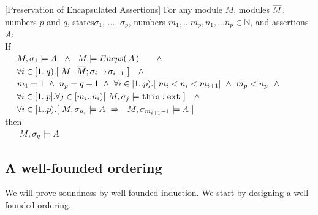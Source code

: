 \begin{auxLemma}
\label{lemma:external_exec_preserves}[Preservation of Encapsulated Assertions]
For any module $M$, modules $\overline{M}$, numbers $p$ and $q$, states$\sigma_1$, .... $\sigma_p$,  numbers $m_1,...m_p, n_1, ... n_p \in \mathbb{N}$, and assertions $A$:
\\
If \\
$\strut \ \ \ \  M, \sigma_1 \models  A   \  \ \wedge \ \ M \models \encaps A \ \ \ \  \ \ \wedge$\\
$\strut \ \ \ \  \forall i\in [1..q).[\   M\cdot \overline{M};\sigma_i\! \rightarrow\! {\sigma_{i+1}}\  ] \  \ \ \wedge$\\
$\strut \ \ \ \  m_1=1 \ \wedge\ n_p=q+1 \  \wedge\ \forall i\in[1..p).[  \  m_i < n_i < m_{i+1}  ] \ \wedge \ m_p<n_p\ \ \wedge  $\\
$\strut \ \ \ \  \forall i\in[1..p].\forall j\in [m_i..n_i)[\   M,\sigma_j \models \texttt{this}:\mbox{\normalfont{\texttt{ext}}} \ ] \  \ \ \wedge$\\
$\strut \ \ \ \ \forall i\in[1..p). [ \ M,\sigma_{n_i} \models A   \ \Rightarrow \ \ 
M, {\sigma_{m_{i+1}-1}} \models A  \ ] $ \\
then\\
$\strut \ \ \ \  \ M, \sigma_q \models  A$
\end{auxLemma}



\subsection{A well-founded ordering}
\label{sect:prove:wellfounded}

We will prove soundness by well-founded induction.
We start by designing a well--founded ordering. 



